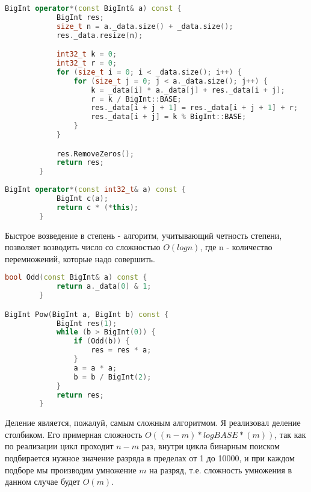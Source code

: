\begin{lstlisting}[language=c++]
BigInt operator*(const BigInt& a) const {
            BigInt res;
            size_t n = a._data.size() + _data.size();
            res._data.resize(n);

            int32_t k = 0;
            int32_t r = 0;
            for (size_t i = 0; i < _data.size(); i++) {
                for (size_t j = 0; j < a._data.size(); j++) {
                    k = _data[i] * a._data[j] + res._data[i + j];
                    r = k / BigInt::BASE;
                    res._data[i + j + 1] = res._data[i + j + 1] + r;
                    res._data[i + j] = k % BigInt::BASE;
                }
            }

            res.RemoveZeros();
            return res;
        }
        
BigInt operator*(const int32_t& a) const {
            BigInt c(a);
            return c * (*this);
        }
\end{lstlisting}

Быстрое возведение в степень - алгоритм, учитывающий четность степени, позволяет возводить число со сложностью $O(log{n})$, где n - количество перемножений, которые надо совершить.

\begin{lstlisting}[language=c++]
bool Odd(const BigInt& a) const {
            return a._data[0] & 1;
        }

BigInt Pow(BigInt a, BigInt b) const {
            BigInt res(1);
            while (b > BigInt(0)) {
                if (Odd(b)) {
                    res = res * a;
                }
                a = a * a;
                b = b / BigInt(2);
            }
            return res; 
        }
\end{lstlisting}
\pagebreak
Деление является, пожалуй, самым сложным алгоритмом. Я реализовал деление столбиком. Его примерная сложность $O((n-m)*log{BASE}*(m))$, так как по реализации цикл проходит $n-m$ раз, внутри цикла бинарным поиском подбирается нужное значение разряда в пределах от 1 до 10000, и при каждом подборе мы производим умножение $m$ на разряд, т.е. сложность умножения в данном случае будет $O(m)$.

